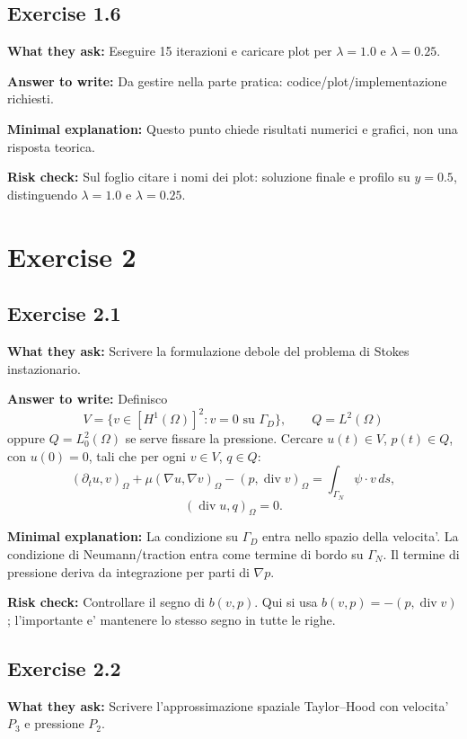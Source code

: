 \documentclass[11pt,a4paper]{article}
\begin{document}
\subsection*{Exercise 1.6}
\textbf{What they ask:} Eseguire 15 iterazioni e caricare plot per \(\lambda=1.0\) e \(\lambda=0.25\).

\textbf{Answer to write:}
Da gestire nella parte pratica: codice/plot/implementazione richiesti.

\textbf{Minimal explanation:}
Questo punto chiede risultati numerici e grafici, non una risposta teorica.

\textbf{Risk check:}
Sul foglio citare i nomi dei plot: soluzione finale e profilo su \(y=0.5\), distinguendo \(\lambda=1.0\) e \(\lambda=0.25\).

\section*{Exercise 2}

\subsection*{Exercise 2.1}
\textbf{What they ask:} Scrivere la formulazione debole del problema di Stokes instazionario.

\textbf{Answer to write:}
Definisco
\[
V=\{v\in[H^1(\Omega)]^2: v=0\text{ su }\Gamma_D\},
\qquad
Q=L^2(\Omega)
\]
oppure \(Q=L^2_0(\Omega)\) se serve fissare la pressione. Cercare \(u(t)\in V\), \(p(t)\in Q\), con \(u(0)=0\), tali che per ogni \(v\in V\), \(q\in Q\):
\[
(\partial_t u,v)_\Omega
+\mu(\nabla u,\nabla v)_\Omega
-(p,\operatorname{div}v)_\Omega
=\int_{\Gamma_N}\psi\cdot v\,ds,
\]
\[
(\operatorname{div}u,q)_\Omega=0.
\]

\textbf{Minimal explanation:}
La condizione su \(\Gamma_D\) entra nello spazio della velocita'. La condizione di Neumann/traction entra come termine di bordo su \(\Gamma_N\). Il termine di pressione deriva da integrazione per parti di \(\nabla p\).

\textbf{Risk check:}
Controllare il segno di \(b(v,p)\). Qui si usa \(b(v,p)=-(p,\operatorname{div}v)\); l'importante e' mantenere lo stesso segno in tutte le righe.

\subsection*{Exercise 2.2}
\textbf{What they ask:} Scrivere l'approssimazione spaziale Taylor--Hood con velocita' \(P_3\) e pressione \(P_2\).
\end{document}
